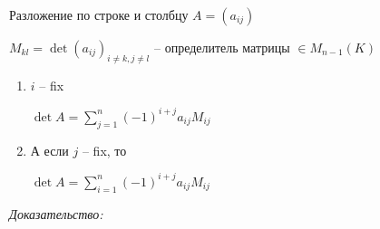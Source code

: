 \documentclass[12pt]{article}
\begin{document}
\begin{theo}{Разложение по строке и столбцу}
    $A = (a_{ij})$

    $M_{kl} = \det (a_{ij})_{i \neq k, j \neq l}$ -- определитель матрицы $\in M_{n - 1}(K)$

    \begin{enumerate}
        \item $i$ -- fix

        $\det A = \sum\limits_{j = 1}^n (-1)^{i + j} a_{ij} M_{ij}$

        \item А если $j$ -- fix, то 

            $\det A = \sum\limits_{i = 1}^n (-1)^{i + j} a_{ij} M_{ij}$
    \end{enumerate}
\end{theo}

\textit{Доказательство:}
\end{document}
